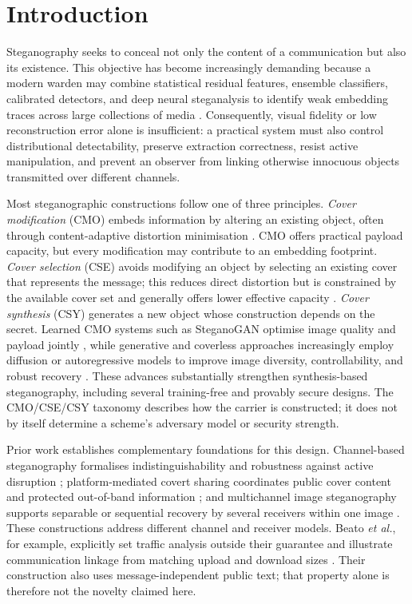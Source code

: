 \documentclass[pdflatex,sn-mathphys-num]{sn-jnl}%
\theoremstyle{definition}
\theoremstyle{game}
\theoremstyle{thmstyleone}%
\theoremstyle{thmstyletwo}%
\theoremstyle{thmstylethree}%
\begin{document}
\section{Introduction}
\label{sec:introduction}

Steganography seeks to conceal not only the content of a communication but also its existence. This objective has become increasingly demanding because a modern warden may combine statistical residual features, ensemble classifiers, calibrated detectors, and deep neural steganalysis to identify weak embedding traces across large collections of media \cite{cachin1998,@hopper2009provably,kombrink2024image,Kodovsky2012Ensemble,Qiao2021AdaptiveSB,Hu2023ImageSA,Zhao2023CalibrationbasedSF}. Consequently, visual fidelity or low reconstruction error alone is insufficient: a practical system must also control distributional detectability, preserve extraction correctness, resist active manipulation, and prevent an observer from linking otherwise innocuous objects transmitted over different channels.

Most steganographic constructions follow one of three principles. \emph{Cover modification} (CMO) embeds information by altering an existing object, often through content-adaptive distortion minimisation \cite{Fridrich2009,sedighi2015content}. CMO offers practical payload capacity, but every modification may contribute to an embedding footprint. \emph{Cover selection} (CSE) avoids modifying an object by selecting an existing cover that represents the message; this reduces direct distortion but is constrained by the available cover set and generally offers lower effective capacity \cite{Hu2017Coverless,Fridrich2009}. \emph{Cover synthesis} (CSY) generates a new object whose construction depends on the secret. Learned CMO systems such as SteganoGAN optimise image quality and payload jointly \cite{zhang2019steganogan}, while generative and coverless approaches increasingly employ diffusion or autoregressive models to improve image diversity, controllability, and robust recovery \cite{yu2023cross,yang2024diffstega,xu2025mddm,qi2025provably,yuan2026provably}. These advances substantially strengthen synthesis-based steganography, including several training-free and provably secure designs. The CMO/CSE/CSY taxonomy describes how the carrier is constructed; it does not by itself determine a scheme's adversary model or security strength.


Prior work establishes complementary foundations for this design.
Channel-based steganography formalises indistinguishability and robustness
against active disruption \cite{@hopper2009provably}; platform-mediated
covert sharing coordinates public cover content and protected out-of-band
information \cite{Ion2013,Beato2014}; and multichannel image steganography
supports separable or sequential recovery by several receivers within one
image \cite{wang2020multichannel}. These constructions address different
channel and receiver models. Beato \emph{et al.}, for example, explicitly
set traffic analysis outside their guarantee and illustrate communication
linkage from matching upload and download sizes \cite{Beato2014}.
Their construction also uses message-independent public text; that
property alone is therefore not the novelty claimed here.
\end{document}
